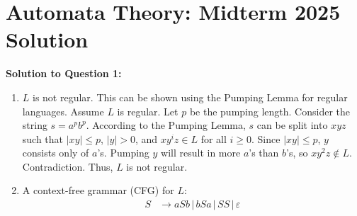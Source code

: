 \documentclass{article}
\begin{document}
\section*{Automata Theory: Midterm 2025 Solution}

\textbf{Solution to Question 1:}

\begin{enumerate}
    \item $L$ is not regular. This can be shown using the Pumping Lemma for regular languages. Assume $L$ is regular. Let $p$ be the pumping length. Consider the string $s = a^p b^p$. According to the Pumping Lemma, $s$ can be split into $xyz$ such that $|xy| \leq p$, $|y| > 0$, and $xy^iz \in L$ for all $i \geq 0$. Since $|xy| \leq p$, $y$ consists only of $a$'s. Pumping $y$ will result in more $a$'s than $b$'s, so $xy^2z \notin L$. Contradiction. Thus, $L$ is not regular.
    \item A context-free grammar (CFG) for $L$:
    \begin{align*}
        S &\to aSb \,|\, bSa \,|\, SS \,|\, \varepsilon
    \end{align*}
\end{enumerate}
\end{document}
